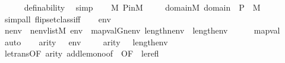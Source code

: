 \begin{isabellebody}
\ \ \ \ \isamarkupfalse%
\ definability\ \isamarkupfalse%
\ simp\isanewline
\ \ \isamarkupfalse%
\ {\isacartoucheopen}{\isasympi}{\isasymin}M{\isacartoucheclose}\ P{\isacharunderscore}{\kern0pt}in{\isacharunderscore}{\kern0pt}M\ \isanewline
\ \ \isamarkupfalse%
\ {\isachardoublequoteopen}domain{\isacharparenleft}{\kern0pt}{\isasympi}{\isacharparenright}{\kern0pt}{\isasymin}M{\isachardoublequoteclose}\ {\isachardoublequoteopen}domain{\isacharparenleft}{\kern0pt}{\isasympi}{\isacharparenright}{\kern0pt}\ {\isasymtimes}\ P\ {\isasymin}\ M{\isachardoublequoteclose}\isanewline
\ \ \ \ \isamarkupfalse%
\ {\isacharparenleft}{\kern0pt}simp{\isacharunderscore}{\kern0pt}all\ flip{\isacharcolon}{\kern0pt}setclass{\isacharunderscore}{\kern0pt}iff{\isacharparenright}{\kern0pt}\isanewline
\ \ \isamarkupfalse%
\ {\isacartoucheopen}env\ {\isasymin}\ {\isacharunderscore}{\kern0pt}{\isacartoucheclose}\isanewline
\ \ \isamarkupfalse%
\ nenv\ \ {\isachardoublequoteopen}nenv{\isasymin}list{\isacharparenleft}{\kern0pt}M{\isacharparenright}{\kern0pt}{\isachardoublequoteclose}\ {\isachardoublequoteopen}env\ {\isacharequal}{\kern0pt}\ map{\isacharparenleft}{\kern0pt}val{\isacharparenleft}{\kern0pt}G{\isacharparenright}{\kern0pt}{\isacharcomma}{\kern0pt}nenv{\isacharparenright}{\kern0pt}{\isachardoublequoteclose}\ {\isachardoublequoteopen}length{\isacharparenleft}{\kern0pt}nenv{\isacharparenright}{\kern0pt}\ {\isacharequal}{\kern0pt}\ length{\isacharparenleft}{\kern0pt}env{\isacharparenright}{\kern0pt}{\isachardoublequoteclose}\isanewline
\ \ \ \ \isamarkupfalse%
\ map{\isacharunderscore}{\kern0pt}val\ \isamarkupfalse%
\ auto\isanewline
\ \ \isamarkupfalse%
\ {\isacartoucheopen}arity{\isacharparenleft}{\kern0pt}{\isasymphi}{\isacharparenright}{\kern0pt}\ {\isasymle}\ {\isacharunderscore}{\kern0pt}{\isacartoucheclose}\ {\isacartoucheopen}env{\isasymin}{\isacharunderscore}{\kern0pt}{\isacartoucheclose}\ {\isacartoucheopen}{\isasymphi}{\isasymin}{\isacharunderscore}{\kern0pt}{\isacartoucheclose}\isanewline
\ \ \isamarkupfalse%
\ {\isachardoublequoteopen}arity{\isacharparenleft}{\kern0pt}{\isasymphi}{\isacharparenright}{\kern0pt}\ {\isasymle}\ {}{\isacharhash}{\kern0pt}{\isacharplus}{\kern0pt}\ length{\isacharparenleft}{\kern0pt}env{\isacharparenright}{\kern0pt}{\isachardoublequoteclose}\ \isanewline
\ \ \ \ \isamarkupfalse%
\ le{\isacharunderscore}{\kern0pt}trans{\isacharbrackleft}{\kern0pt}OF\ {\isacartoucheopen}arity{\isacharparenleft}{\kern0pt}{\isasymphi}{\isacharparenright}{\kern0pt}{\isasymle}{\isacharunderscore}{\kern0pt}{\isacartoucheclose}{\isacharbrackright}{\kern0pt}\ add{\isacharunderscore}{\kern0pt}le{\isacharunderscore}{\kern0pt}mono{\isacharbrackleft}{\kern0pt}of\ {}\ {}{\isacharcomma}{\kern0pt}OF\ {\isacharunderscore}{\kern0pt}\ le{\isacharunderscore}{\kern0pt}refl{\isacharbrackright}{\kern0pt}\ \isanewline

\end{isabellebody}
